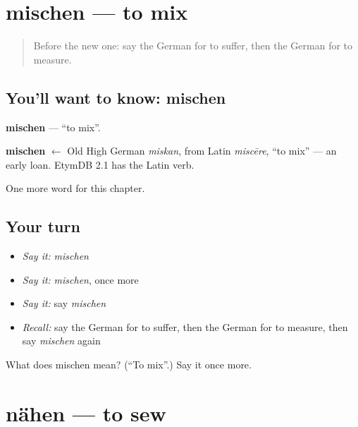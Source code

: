 \section[mischen]{mischen — to mix}

\label{lesson:GE-C183-mischen}



\begin{quote}
Before the new one: say the German for to suffer, then the German for to measure.
\end{quote}

\subsection*{You'll want to know: mischen}
\textbf{mischen} — \textquotedblleft{}to mix\textquotedblright{}.

\begin{cousinweb}
\textbf{mischen} $\leftarrow$ Old High German \emph{miskan}, from Latin \emph{miscēre}, \textquotedblleft{}to mix\textquotedblright{} — an early loan. EtymDB 2.1 has the Latin verb.
\end{cousinweb}

\begin{grammarlens}[title={What you've built}]
One more word for this chapter.
\end{grammarlens}

\subsection*{Your turn}
\begin{itemize}
\raggedright
  \item \emph{Say it:} \emph{mischen}
  \item \emph{Say it:} \emph{mischen}, once more
  \item \emph{Say it:} say \emph{mischen}
  \item \emph{Recall:} say the German for to suffer, then the German for to measure, then say \emph{mischen} again
\end{itemize}

\begin{tcolorbox}[breakable,colback=teal!4,colframe=teal!35!black,title={Before you move on}]
What does mischen mean? (\textquotedblleft{}To mix\textquotedblright{}.) Say it once more.
\end{tcolorbox}
\section[nähen]{nähen — to sew}

